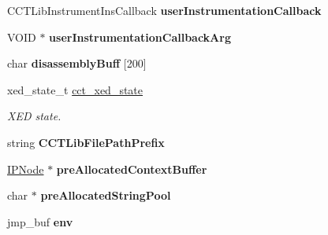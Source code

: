 \begin{DoxyCompactItemize}
\item 
\hypertarget{structPinCCTLib_1_1CCT__LIB__GLOBAL__STATE_a3065d122bd7f3046284cf23a558a03c1}{C\-C\-T\-Lib\-Instrument\-Ins\-Callback {\bfseries user\-Instrumentation\-Callback}}\label{structPinCCTLib_1_1CCT__LIB__GLOBAL__STATE_a3065d122bd7f3046284cf23a558a03c1}

\item 
\hypertarget{structPinCCTLib_1_1CCT__LIB__GLOBAL__STATE_a4fefcc642fa4a3c60d2418f8661a6571}{V\-O\-I\-D $\ast$ {\bfseries user\-Instrumentation\-Callback\-Arg}}\label{structPinCCTLib_1_1CCT__LIB__GLOBAL__STATE_a4fefcc642fa4a3c60d2418f8661a6571}

\item 
\hypertarget{structPinCCTLib_1_1CCT__LIB__GLOBAL__STATE_a95e9169f3bdfde0941c6af9d15bb2269}{char {\bfseries disassembly\-Buff} \mbox{[}200\mbox{]}}\label{structPinCCTLib_1_1CCT__LIB__GLOBAL__STATE_a95e9169f3bdfde0941c6af9d15bb2269}

\item 
\hypertarget{structPinCCTLib_1_1CCT__LIB__GLOBAL__STATE_a207480a7ed924d983451828c7d4fba68}{xed\-\_\-state\-\_\-t \hyperlink{structPinCCTLib_1_1CCT__LIB__GLOBAL__STATE_a207480a7ed924d983451828c7d4fba68}{cct\-\_\-xed\-\_\-state}}\label{structPinCCTLib_1_1CCT__LIB__GLOBAL__STATE_a207480a7ed924d983451828c7d4fba68}

\begin{DoxyCompactList}\small\item\em X\-E\-D state. \end{DoxyCompactList}\item 
\hypertarget{structPinCCTLib_1_1CCT__LIB__GLOBAL__STATE_a02bb76b5b34c8dd7f092d6ba787def18}{string {\bfseries C\-C\-T\-Lib\-File\-Path\-Prefix}}\label{structPinCCTLib_1_1CCT__LIB__GLOBAL__STATE_a02bb76b5b34c8dd7f092d6ba787def18}

\item 
\hypertarget{structPinCCTLib_1_1CCT__LIB__GLOBAL__STATE_a38e305d4c29c5d430878c840465787a3}{\hyperlink{structPinCCTLib_1_1IPNode}{I\-P\-Node} $\ast$ {\bfseries pre\-Allocated\-Context\-Buffer}}\label{structPinCCTLib_1_1CCT__LIB__GLOBAL__STATE_a38e305d4c29c5d430878c840465787a3}

\item 
\hypertarget{structPinCCTLib_1_1CCT__LIB__GLOBAL__STATE_a80abd1e038263e50f82e40f92cf1016b}{char $\ast$ {\bfseries pre\-Allocated\-String\-Pool}}\label{structPinCCTLib_1_1CCT__LIB__GLOBAL__STATE_a80abd1e038263e50f82e40f92cf1016b}

\item 
\hypertarget{structPinCCTLib_1_1CCT__LIB__GLOBAL__STATE_afd808e16afe2edc4eea55787c82f35d6}{jmp\-\_\-buf {\bfseries env}}\label{structPinCCTLib_1_1CCT__LIB__GLOBAL__STATE_afd808e16afe2edc4eea55787c82f35d6}


\end{DoxyCompactItemize}
